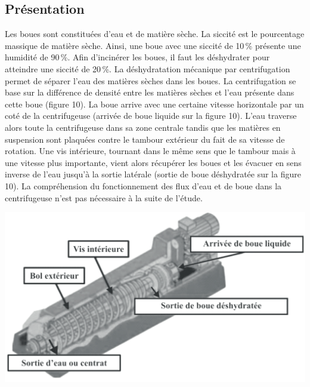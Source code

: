 \documentclass[10pt,fleqn]{article} %
\newif\ifcolle
\begin{document}

\vspace{4.5cm}
\pagestyle{fancy}
\thispagestyle{plain}


\def\columnseprulecolor{\color{ocre}}
\setlength{\columnseprule}{0.4pt} 

\ifprof
\else
\begin{multicols}{2}
\fi

\section*{Présentation}


\ifcolle
\else
Les boues sont constituées d’eau et de matière sèche. La siccité est le pourcentage massique de matière
sèche. Ainsi, une boue avec une siccité de 10\,\% présente une humidité de 90\,\%. Afin
d’incinérer les boues, il faut les déshydrater pour atteindre une siccité de 20\,\%. La déshydratation
mécanique par centrifugation permet de séparer l’eau des matières sèches dans les boues.
La centrifugation se base sur la différence de densité entre les matières sèches et l’eau présente dans
cette boue (figure 10). La boue arrive avec une certaine vitesse horizontale par un coté de la centrifugeuse
(arrivée de boue liquide sur la figure 10). L’eau traverse alors toute la centrifugeuse dans sa
zone centrale tandis que les matières en suspension sont plaquées contre le tambour extérieur du fait
de sa vitesse de rotation. Une vis intérieure, tournant dans le même sens que le tambour mais à une
vitesse plus importante, vient alors récupérer les boues et les évacuer en sens inverse de l’eau jusqu’à
la sortie latérale (sortie de boue déshydratée sur la figure 10). La compréhension du fonctionnement
des flux d’eau et de boue dans la centrifugeuse n’est pas nécessaire à la suite de l’étude.


\begin{center}
\includegraphics[width=\linewidth]{images/fig_01}
\end{center}


\end{multicols}
\end{document}
